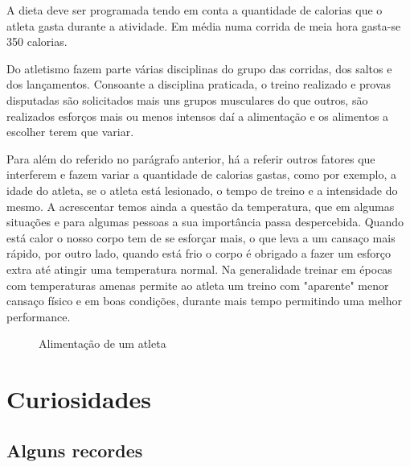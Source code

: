 \documentclass{report}
\begin{document}
    A dieta deve ser programada tendo em conta a quantidade de calorias que o atleta gasta durante a atividade. Em média numa corrida de meia hora gasta-se 350 calorias. \par
    Do atletismo fazem parte várias disciplinas do grupo das corridas, dos saltos e dos lançamentos. Consoante a disciplina praticada, o treino realizado e provas disputadas são solicitados mais uns grupos musculares do que outros, são realizados esforços mais ou menos intensos daí a alimentação e os alimentos a escolher terem que variar. \par 
    Para além do referido no parágrafo anterior, há a referir outros fatores que interferem e fazem variar a quantidade de calorias gastas, como por exemplo, a idade do atleta, se o atleta está lesionado, o tempo de treino e a intensidade do mesmo. A acrescentar temos ainda a questão da temperatura, que em algumas situações e para algumas pessoas a sua importância passa despercebida. Quando está calor o nosso corpo tem de se esforçar mais, o que leva a um cansaço mais rápido, por outro lado, quando está frio o corpo é obrigado a fazer um esforço extra até atingir uma temperatura normal. Na generalidade treinar em épocas com temperaturas amenas permite ao atleta um treino com "aparente" menor cansaço físico e em boas condições, durante mais tempo permitindo uma melhor performance. \cite{alimentacao}
    \hfill \newline
    \hfill \newline
    \begin{figure}[h]
    
        \begin{center}
            \caption{Alimentação de um atleta}
        \end{center}
    \end{figure}

    
    \chapter{Curiosidades}
    \label{chap.Curiosidades}
    \section{Alguns recordes}
\end{document}
